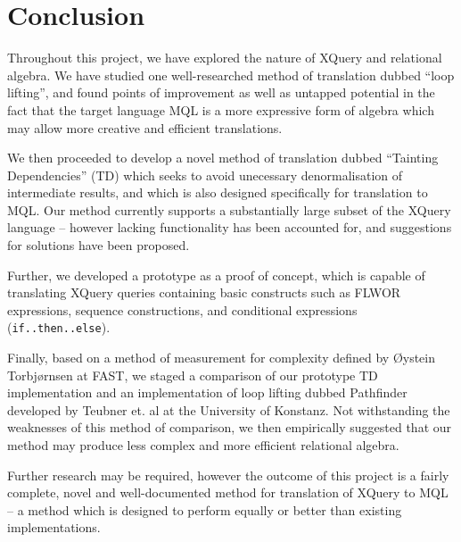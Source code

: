 \chapter{Conclusion}
\label{chapter:conclusion}
Throughout this project, we have explored the nature of XQuery and relational
algebra. We have studied one well-researched method of translation dubbed ``loop
lifting'', and found points of improvement as well as untapped potential in the
fact that the target language MQL is a more expressive form of algebra
which may allow more creative and efficient translations.

We then proceeded to develop a novel method of translation dubbed ``Tainting
Dependencies'' (TD) which seeks to avoid unecessary denormalisation of
intermediate results, and which is also designed specifically for translation
to MQL. Our method currently supports a substantially large subset of the XQuery
language -- however lacking functionality has been accounted for, and suggestions for
solutions have been proposed.

Further, we developed a prototype as a proof of concept, which is capable of
translating XQuery queries containing basic constructs such as FLWOR
expressions, sequence constructions, and conditional expressions
(\texttt{if..then..else}).

Finally, based on a method of measurement for complexity defined by \O ystein
Torbj\o rnsen at FAST, we staged a comparison of our prototype TD implementation
and an implementation of loop lifting dubbed Pathfinder developed by Teubner
et. al at the University of Konstanz. Not withstanding the weaknesses of this
method of comparison, we then empirically suggested that our method may
produce less complex and more efficient relational algebra.

Further research may be required, however the outcome of this project is a
fairly complete, novel and well-documented method for translation of XQuery to
MQL -- a method which is designed to perform equally or better than existing
implementations.

% 
